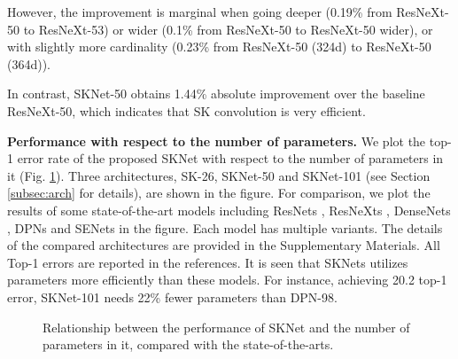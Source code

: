 \documentclass[10pt,twocolumn,letterpaper]{article}
\begin{document}
	However, the improvement is marginal when going deeper (0.19\% from ResNeXt-50 to ResNeXt-53) or wider (0.1\% from ResNeXt-50 to ResNeXt-50 wider), or with slightly more cardinality  (0.23\% from ResNeXt-50 (324d) to ResNeXt-50 (364d)). 
	
	In contrast, SKNet-50 obtains 1.44\% absolute improvement over the baseline ResNeXt-50, which indicates that SK convolution is very efficient.
	
	\vspace{6 pt}
	\noindent \textbf{Performance with respect to the number of parameters.} We plot the top-1 error rate of the proposed SKNet with respect to the number of parameters in it (Fig. \ref{fig_parameter}). Three architectures, SK-26, SKNet-50 and SKNet-101 (see Section \ref{subsec:arch} for details), are shown in the figure. For comparison, we plot the results of some state-of-the-art models including ResNets \cite{he2016deep}, ResNeXts \cite{xie2017aggregated}, DenseNets \cite{huang2017densely}, DPNs \cite{chen2017dual} and SENets \cite{hu2017squeeze} in the figure. Each model has multiple variants. The details of the compared architectures are provided in the Supplementary Materials. {All Top-1 errors are reported in the references.} It is seen that SKNets utilizes parameters more efficiently than these models. For instance, achieving 20.2 top-1 error, SKNet-101 needs 22\% fewer parameters than DPN-98. 
	
	\begin{figure}[t]
		\begin{center}
			\setlength{\fboxrule}{0pt}
		\end{center}	
		\vspace{-14pt}
		\caption{Relationship between the performance of SKNet and the number of parameters in it, compared with the state-of-the-arts.}
		\label{fig_parameter}
		\vspace{-2pt}
	\end{figure}
	
\end{document}
